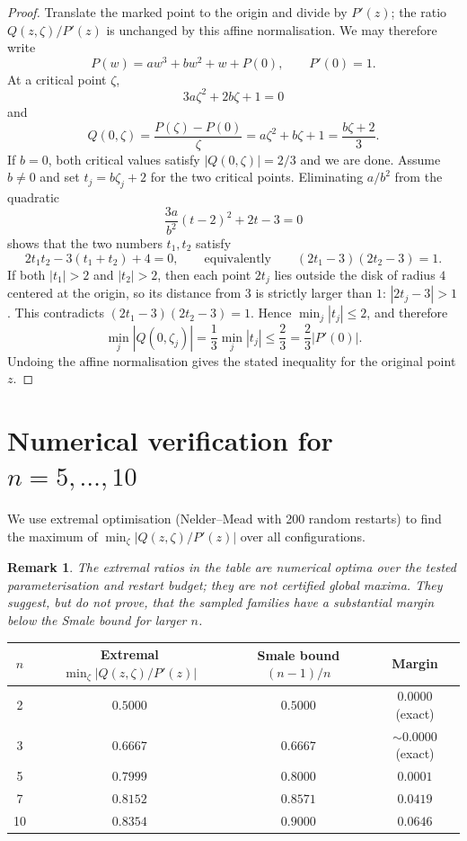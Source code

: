 \documentclass[11pt,a4paper]{article}
\newtheorem{remark}[theorem]{Remark}
\begin{document}
\begin{proof}
Translate the marked point to the origin and divide by $P'(z)$; the ratio
$Q(z,\zeta)/P'(z)$ is unchanged by this affine normalisation. We may therefore
write
\[
P(w)=a w^3+b w^2+w+P(0), \qquad P'(0)=1.
\]
At a critical point $\zeta$,
\[
3a\zeta^2+2b\zeta+1=0
\]
and
\[
Q(0,\zeta)=\frac{P(\zeta)-P(0)}{\zeta}
          =a\zeta^2+b\zeta+1
          =\frac{b\zeta+2}{3}.
\]
If $b=0$, both critical values satisfy $|Q(0,\zeta)|=2/3$ and we are done.
Assume $b\ne 0$ and set $t_j=b\zeta_j+2$ for the two critical points. Eliminating
$a/b^2$ from the quadratic
\[
\frac{3a}{b^2}(t-2)^2+2t-3=0
\]
shows that the two numbers $t_1,t_2$ satisfy
\[
2t_1t_2-3(t_1+t_2)+4=0,
\qquad\text{equivalently}\qquad
(2t_1-3)(2t_2-3)=1.
\]
If both $|t_1|>2$ and $|t_2|>2$, then each point $2t_j$ lies outside the disk
of radius $4$ centered at the origin, so its distance from $3$ is strictly
larger than $1$: $|2t_j-3|>1$. This contradicts
$(2t_1-3)(2t_2-3)=1$. Hence $\min_j |t_j|\le 2$, and therefore
\[
\min_j |Q(0,\zeta_j)|=\frac{1}{3}\min_j |t_j|\le \frac{2}{3}
=\frac{2}{3}|P'(0)|.
\]
Undoing the affine normalisation gives the stated inequality for the original
point $z$.
\end{proof}

\section{Numerical verification for $n = 5, \dots, 10$}

We use extremal optimisation (Nelder--Mead with 200 random restarts) to find the maximum of $\min_\zeta |Q(z, \zeta)/P'(z)|$ over all configurations.

\begin{remark}
The extremal ratios in the table are numerical optima over the tested
parameterisation and restart budget; they are not certified global maxima.
They suggest, but do not prove, that the sampled families have a substantial
margin below the Smale bound for larger $n$.
\end{remark}

\begin{center}
\begin{tabular}{cccc}
\toprule
$n$ & Extremal $\min_\zeta |Q(z, \zeta)/P'(z)|$ & Smale bound $(n-1)/n$ & Margin \\
\midrule
2  & $0.5000$ & $0.5000$ & $0.0000$ (exact) \\
3  & $0.6667$ & $0.6667$ & $\sim 0.0000$ (exact) \\
5  & $0.7999$ & $0.8000$ & $0.0001$ \\
7  & $0.8152$ & $0.8571$ & $0.0419$ \\
10 & $0.8354$ & $0.9000$ & $0.0646$ \\
\bottomrule
\end{tabular}
\end{center}
\end{document}
